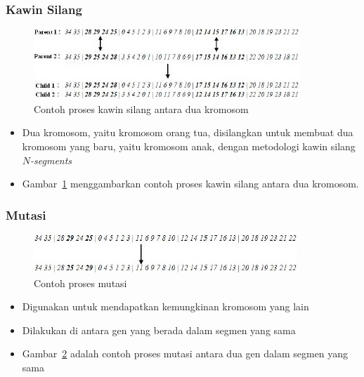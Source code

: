 \documentclass{beamer}
\begin{document}
\begin{frame}
\frametitle{Kawin Silang}
\begin{figure}
\centering
\captionsetup{justification=centering}
\includegraphics[scale=0.75]{Gambar/HybridGenetic9}
\caption[Contoh proses kawin silang antara dua kromosom ~\cite{johanna:12:hybrid}]{Contoh proses kawin silang antara dua kromosom ~\cite{johanna:12:hybrid}}
\label{fig:hybrid9}
\end{figure}
\begin{itemize}
\item Dua kromosom, yaitu kromosom orang tua, disilangkan untuk membuat dua kromosom yang baru, yaitu kromosom anak, dengan metodologi kawin silang \textit{\begin{math}N\end{math}-segments}
\item Gambar~\ref{fig:hybrid9} menggambarkan contoh proses kawin silang antara dua kromosom.
\end{itemize}
\end{frame}


\begin{frame}
\frametitle{Mutasi}
\begin{figure}
\centering
\captionsetup{justification=centering}
\includegraphics[scale=0.75]{Gambar/HybridGenetic10}
\caption[Contoh proses mutasi ~\cite{johanna:12:hybrid}]{Contoh proses mutasi ~\cite{johanna:12:hybrid}}
\label{fig:hybrid10}
\end{figure}
\begin{itemize}
\item Digunakan untuk mendapatkan kemungkinan kromosom yang lain
\item Dilakukan di antara gen yang berada dalam segmen yang sama
\item Gambar~\ref{fig:hybrid10} adalah contoh proses mutasi antara dua gen dalam segmen yang sama
\end{itemize}
\end{frame}
\end{document}

